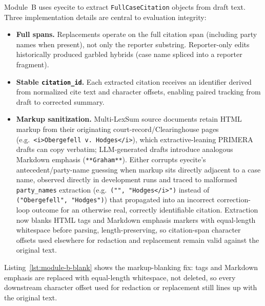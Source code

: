 Module~B uses eyecite \cite{eyecite2021} to extract \texttt{FullCaseCitation} objects from draft text. Three implementation details are central to evaluation integrity:

\begin{itemize}
  \item \textbf{Full spans.} Replacements operate on the full citation span (including party names when present), not only the reporter substring. Reporter-only edits historically produced garbled hybrids (case name spliced into a reporter fragment).
  \item \textbf{Stable \texttt{citation\_id}.} Each extracted citation receives an identifier derived from normalized cite text and character offsets, enabling paired tracking from draft to corrected summary.
  \item \textbf{Markup sanitization.} Multi-LexSum source documents retain HTML markup from their originating court-record/Clearinghouse pages (e.g.\ \texttt{<i>Obergefell v.\ Hodges</i>}), which extractive-leaning PRIMERA drafts can copy verbatim; LLM-generated drafts introduce analogous Markdown emphasis (\texttt{**Graham**}). Either corrupts eyecite's antecedent/party-name guessing when markup sits directly adjacent to a case name, observed directly in development runs and traced to malformed \texttt{party\_names} extraction (e.g.\ \texttt{("", "Hodges</i>")} instead of \texttt{("Obergefell", "Hodges")}) that propagated into an incorrect correction-loop outcome for an otherwise real, correctly identifiable citation. Extraction now blanks HTML tags and Markdown emphasis markers with equal-length whitespace before parsing, length-preserving, so citation-span character offsets used elsewhere for redaction and replacement remain valid against the original text.
\end{itemize}

Listing~\ref{lst:module-b-blank} shows the markup-blanking fix: tags and Markdown emphasis are replaced with equal-length whitespace, not deleted, so every downstream character offset used for redaction or replacement still lines up with the original text.

